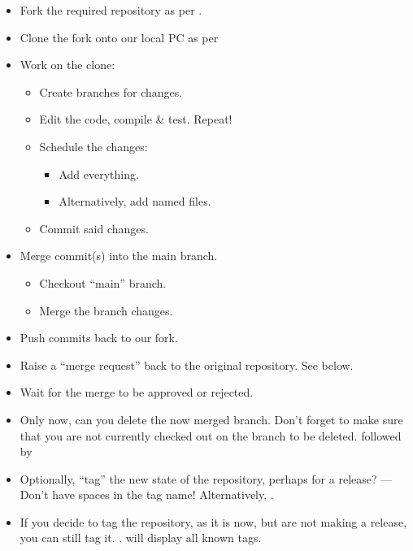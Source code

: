 \begin{itemize}
    \item Fork the required repository as per .
    \item Clone the fork onto our local PC as per 
    \item Work on the clone:
    \begin{itemize}
        \item Create branches for changes. 
        \item Edit the code, compile \& test. Repeat!
        \item Schedule the changes:
        \begin{itemize}
            \item Add everything. 
            \item Alternatively, add named files. 
        \end{itemize}
        \item Commit said changes. 
        \end{itemize}
        \item Merge commit(s) into the main branch.
        \begin{itemize}
            \item Checkout ``main'' branch. 
            \item Merge the branch changes. 
    \end{itemize}
    \item Push commits back to our fork. 
    \item Raise a ``merge request'' back to the original repository. See  below.
    \item Wait for the merge to be approved or rejected.
    \item Only now, can you delete the now merged branch. Don't forget to make sure that you are not currently checked out on the branch to be deleted.  followed by 
    \item Optionally, ``tag'' the new state of the repository, perhaps for a release? ---Don't have spaces in the tag name! Alternatively, .
    \item If you decide to tag the repository, as it is now, but are not making a release, you can still tag it. .  will display all known tags.
\end{itemize}

